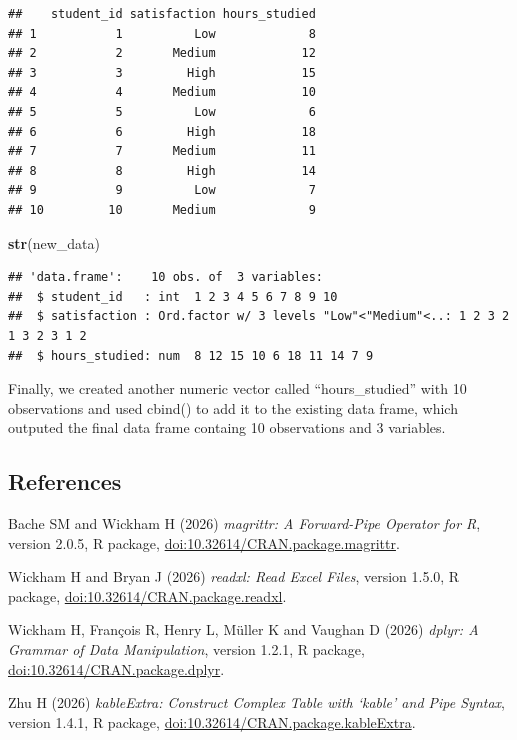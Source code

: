 \documentclass[
]{article}
\newenvironment{Shaded}{\begin{snugshade}}{\end{snugshade}}
\newcommand{\FunctionTok}[1]{\textcolor[rgb]{0.13,0.29,0.53}{\textbf{#1}}}
\newcommand{\NormalTok}[1]{#1}
\begin{document}
\begin{verbatim}
##    student_id satisfaction hours_studied
## 1           1          Low             8
## 2           2       Medium            12
## 3           3         High            15
## 4           4       Medium            10
## 5           5          Low             6
## 6           6         High            18
## 7           7       Medium            11
## 8           8         High            14
## 9           9          Low             7
## 10         10       Medium             9
\end{verbatim}

\begin{Shaded}
\begin{Highlighting}[]
\FunctionTok{str}\NormalTok{(new\_data)}
\end{Highlighting}
\end{Shaded}

\begin{verbatim}
## 'data.frame':    10 obs. of  3 variables:
##  $ student_id   : int  1 2 3 4 5 6 7 8 9 10
##  $ satisfaction : Ord.factor w/ 3 levels "Low"<"Medium"<..: 1 2 3 2 1 3 2 3 1 2
##  $ hours_studied: num  8 12 15 10 6 18 11 14 7 9
\end{verbatim}

Finally, we created another numeric vector called ``hours\_studied''
with 10 observations and used cbind() to add it to the existing data
frame, which outputed the final data frame containg 10 observations and
3 variables.

\subsection{\texorpdfstring{\textbf{References}}{References}}\label{references}

Bache SM and Wickham H (2026) \emph{magrittr: A Forward-Pipe Operator
for R}, version 2.0.5, R package,
\url{doi:10.32614/CRAN.package.magrittr}.

Wickham H and Bryan J (2026) \emph{readxl: Read Excel Files}, version
1.5.0, R package, \url{doi:10.32614/CRAN.package.readxl}.

Wickham H, François R, Henry L, Müller K and Vaughan D (2026)
\emph{dplyr: A Grammar of Data Manipulation}, version 1.2.1, R package,
\url{doi:10.32614/CRAN.package.dplyr}.

Zhu H (2026) \emph{kableExtra: Construct Complex Table with `kable' and
Pipe Syntax}, version 1.4.1, R package,
\url{doi:10.32614/CRAN.package.kableExtra}.
\end{document}
